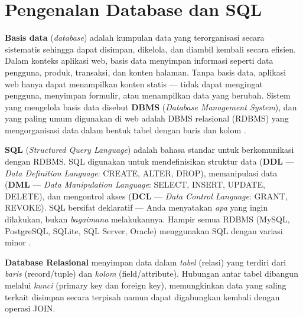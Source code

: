 ﻿\section{Pengenalan Database dan SQL}

\textbf{Basis data} (\textit{database}) adalah kumpulan data yang terorganisasi secara sistematis sehingga dapat disimpan, dikelola, dan diambil kembali secara efisien. Dalam konteks aplikasi web, basis data menyimpan informasi seperti data pengguna, produk, transaksi, dan konten halaman. Tanpa basis data, aplikasi web hanya dapat menampilkan konten statis --- tidak dapat mengingat pengguna, menyimpan formulir, atau menampilkan data yang berubah. Sistem yang mengelola basis data disebut \textbf{DBMS} (\textit{Database Management System}), dan yang paling umum digunakan di web adalah DBMS relasional (RDBMS) yang mengorganisasi data dalam bentuk tabel dengan baris dan kolom \cite{mysqlDocs}.

\textbf{SQL} (\textit{Structured Query Language}) adalah bahasa standar untuk berkomunikasi dengan RDBMS. SQL digunakan untuk mendefinisikan struktur data (\textbf{DDL} --- \textit{Data Definition Language}: CREATE, ALTER, DROP), memanipulasi data (\textbf{DML} --- \textit{Data Manipulation Language}: SELECT, INSERT, UPDATE, DELETE), dan mengontrol akses (\textbf{DCL} --- \textit{Data Control Language}: GRANT, REVOKE). SQL bersifat deklaratif --- Anda menyatakan \textit{apa} yang ingin dilakukan, bukan \textit{bagaimana} melakukannya. Hampir semua RDBMS (MySQL, PostgreSQL, SQLite, SQL Server, Oracle) menggunakan SQL dengan variasi minor \cite{mysqlGettingStarted}.

\begin{konsep}
\textbf{Database Relasional} menyimpan data dalam \textit{tabel} (relasi) yang terdiri dari \textit{baris} (record/tuple) dan \textit{kolom} (field/attribute). Hubungan antar tabel dibangun melalui \textit{kunci} (primary key dan foreign key), memungkinkan data yang saling terkait disimpan secara terpisah namun dapat digabungkan kembali dengan operasi JOIN.
\end{konsep}

